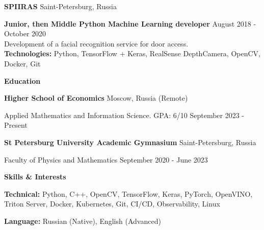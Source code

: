 \documentclass[11pt]{article}
\begin{document}
\textbf{SPIIRAS} \hfill Saint-Petersburg, Russia

\textbf{Junior, then Middle Python Machine Learning developer} \hfill August 2018 - October 2020 \\[2ex]
Development of a facial recognition service for door access. \\
\textbf{Technologies:} Python, TensorFlow + Keras, RealSense DepthCamera, OpenCV, Docker, Git

\vspace{12pt}

\begin{center}
    \textbf{Education}
\end{center}
\textbf{Higher School of Economics} \hfill Moscow, Russia (Remote)

Applied Mathematics and Information Science. GPA: 6/10 \hfill September 2023 - Present

\vspace{12pt}

\textbf{St Petersburg University Academic Gymnasium} \hfill	Saint-Petersburg, Russia

Faculty of Physics and Mathematics \hfill September 2020 - June 2023

\vspace{12pt}

\begin{center}
    \textbf{Skills \& Interests}
\end{center}

\textbf{Technical:} Python, C++, OpenCV, TensorFlow, Keras, PyTorch, OpenVINO, Triton Server, Docker, Kubernetes, Git, CI/CD, Observability, Linux

\textbf{Language:} Russian (Native), English (Advanced)

\end{document}
